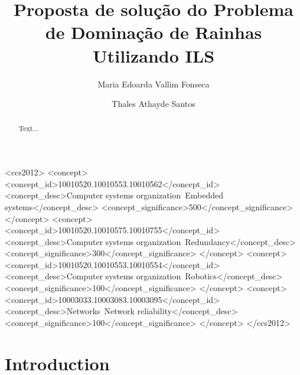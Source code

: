 \documentclass[sigconf]{acmart}
\begin{document}
\title{Proposta de solução do Problema de Dominação de Rainhas Utilizando ILS}

\author{Maria Edoarda Vallim Fonseca}

\author{Thales Athayde Santos}

\begin{abstract}
Text...
\end{abstract}

%
%
\begin{CCSXML}
<ccs2012>
 <concept>
  <concept_id>10010520.10010553.10010562</concept_id>
  <concept_desc>Computer systems organization~Embedded systems</concept_desc>
  <concept_significance>500</concept_significance>
 </concept>
 <concept>
  <concept_id>10010520.10010575.10010755</concept_id>
  <concept_desc>Computer systems organization~Redundancy</concept_desc>
  <concept_significance>300</concept_significance>
 </concept>
 <concept>
  <concept_id>10010520.10010553.10010554</concept_id>
  <concept_desc>Computer systems organization~Robotics</concept_desc>
  <concept_significance>100</concept_significance>
 </concept>
 <concept>
  <concept_id>10003033.10003083.10003095</concept_id>
  <concept_desc>Networks~Network reliability</concept_desc>
  <concept_significance>100</concept_significance>
 </concept>
</ccs2012>
\end{CCSXML}



\maketitle

\section{Introduction}
\end{document}
